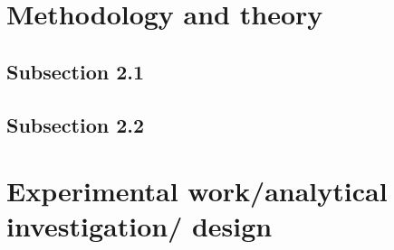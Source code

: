 \section{Methodology and theory}
\label{sec:problem_description}
\subsection{Subsection 2.1}
\subsection{Subsection 2.2}



\section{Experimental work/analytical investigation/ design}
\FloatBarrier
